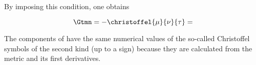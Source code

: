 By imposing this condition, one obtains 

\begin{equation}\label{eq:riemannconnection}
\Gtmn=-\christoffel{\mu}{\nu}{\tau} =
\end{equation}
%

The components of \Gtmn have the same numerical values of the so-called Christoffel symbols of the second kind (up to a sign) because they are calculated from the metric \gmn and its first derivatives.




%
%
%
%
%
%



